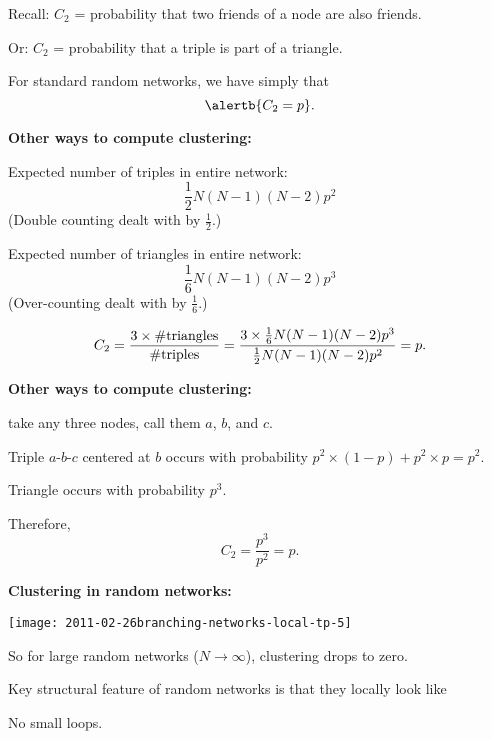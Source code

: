 \begin{frame}[label=]
\begin{frame}[label=]
\begin{frame}[label=]
\begin{frame}[label=]
\begin{frame}[label=]
      Recall:
      $C_2$ = probability that two friends
      of a node are also friends. 
     
      Or: $C_2$ = probability that a triple is part of a triangle.
     
      For standard random networks, we have simply
      that 
      $$\alertb{C_2 = p}.$$
    
      

  \textbf{Other ways to compute clustering:}

  
   
    Expected number of triples in entire network:
    $$
    \frac{1}{2}N(N-1)(N-2)p^2
    $$
    (Double counting dealt with by $\frac{1}{2}$.)
   
    Expected number of triangles in entire network:
    $$
    \frac{1}{6}N(N-1)(N-2)p^3
    $$
    (Over-counting dealt with by $\frac{1}{6}$.)
  
    $$ 
    C_2 = \frac{3 \times \textnormal{\#triangles}}{\textnormal{\#triples}} 
    = 
    \frac{
      3 \times \frac{1}{6}N(N-1)(N-2)p^3
    }
    {
      \frac{1}{2}N(N-1)(N-2)p^2
    }
    = p.
    $$
  


  \textbf{Other ways to compute clustering:}

  
  
     take any three nodes, call them $a$, $b$, and $c$.
  
    Triple $a$-$b$-$c$ centered at $b$ occurs with probability
    $p^2 \times (1-p) + p^2 \times p = p^2$.
  
    Triangle occurs with probability $p^3$.
  
    Therefore, 
    $$
    C_2 = \frac{p^3}{p^2} = p.
    $$
  


  \textbf{Clustering in random networks:}
  
      
    \texttt{[image: 2011-02-26branching-networks-local-tp-5]}
    
    
     
      So for large random networks ($N \rightarrow \infty$),
      clustering drops to zero.
     
      Key structural feature of random networks is that
      they locally look like\\ 
     
      No small loops.
    

\end{frame}
\end{frame}
\end{frame}
\end{frame}
\end{frame}
